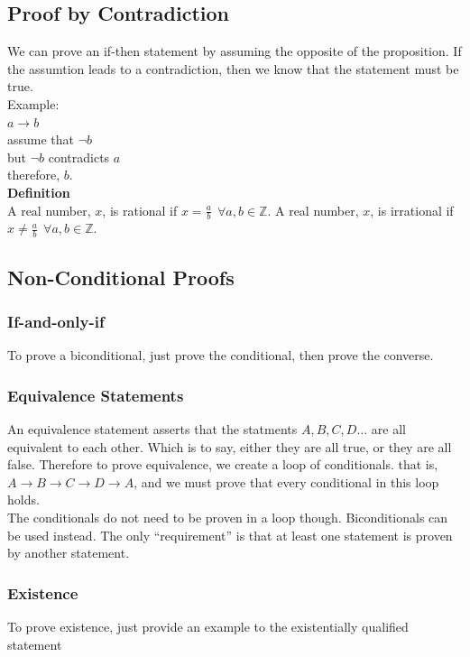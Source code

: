 \documentclass[a4paper,11pt]{article}
\begin{document}
\subsection{Proof by Contradiction}
We can prove an if-then statement by assuming the opposite of the proposition. If the assumtion leads to a contradiction, then we know that the statement must be true.\medskip\\
Example:\\
$a \rightarrow b$\\
assume that $\neg b$\\
but $\neg b$ contradicts $a$\\
therefore, $b$.\bigskip\\
\textbf{Definition}\\
A real number, $x$, is rational if $x=\frac{a}{b}~~\forall a,b \in \mathbb{Z}$.
A real number, $x$, is irrational if $x \neq \frac{a}{b}~~\forall a,b \in \mathbb{Z}$.

\textbf{}

\subsection{Non-Conditional Proofs}
\subsubsection{If-and-only-if}
To prove a biconditional, just prove the conditional, then prove the converse.

\subsubsection{Equivalence Statements}
An equivalence statement asserts that the statments $A,B,C,D\dots$ are all equivalent to each other. Which is to say, either they are all true, or they are all false. Therefore to prove equivalence, we create a loop of conditionals. that is, $A\rightarrow B \rightarrow C \rightarrow D \rightarrow A$, and we must prove that every conditional in this loop holds.\\
The conditionals do not need to be proven in a loop though. Biconditionals can be used instead. The only ``requirement'' is that at least one statement is proven by another statement.

\subsubsection{Existence}
To prove existence, just provide an example to the existentially qualified statement
\end{document}
